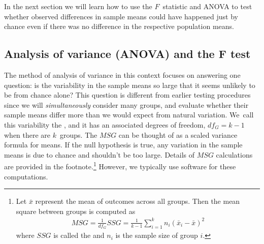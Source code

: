 In the next section we will learn how to use the $F$~statistic
and ANOVA to test whether observed differences in sample means
could have happened just by chance even if there was no
difference in the respective population means.


\subsection{Analysis of variance (ANOVA) and the F test}

The method of analysis of variance in this context focuses
on answering one question:
is the variability in the sample means so large that it seems
unlikely to be from chance alone?
This question is different from earlier testing procedures
since we will \emph{simultaneously} consider many groups,
and evaluate whether their sample means differ more than
we would expect from natural variation.
We~call this variability the
,
and it has an associated degrees of freedom,
$df_{G} = k - 1$ when there are
$k$~groups.
The $MSG$ can be thought of as a scaled variance formula
for means.
If the null hypothesis is true, any variation in the sample
means is due to chance and shouldn't be too large.
Details of $MSG$ calculations are provided in the
footnote.\footnote{Let $\bar{x}$ represent the mean of
  outcomes across all groups.
  Then the mean square between groups is computed as
  \begin{align*}
  MSG
    = \frac{1}{df_{G}}SSG
    = \frac{1}{k-1}\sum_{i=1}^{k} n_{i}
        \left(\bar{x}_{i} - \bar{x}\right)^2
  \end{align*}
  where $SSG$ is called the 
  and $n_{i}$ is the sample size of group $i$.}
However, we typically use software for these computations.


